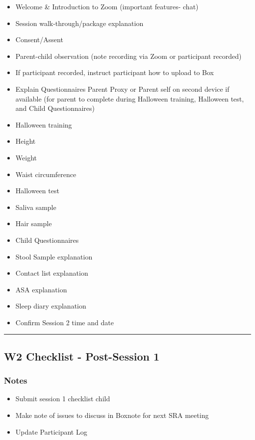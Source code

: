 \documentclass[]{book}
\providecommand{\tightlist}{%
  \setlength{\itemsep}{0pt}\setlength{\parskip}{0pt}}
\begin{document}
\begin{itemize}
\tightlist
\item
  Welcome \& Introduction to Zoom (important features- chat)
\item
  Session walk-through/package explanation
\item
  Consent/Assent
\item
  Parent-child observation (note recording via Zoom or participant recorded)
\item
  If participant recorded, instruct participant how to upload to Box
\item
  Explain Questionnaires Parent Proxy or Parent self on second device if available (for parent to complete during Halloween training, Halloween test, and Child Questionnaires)
\item
  Halloween training
\item
  Height
\item
  Weight
\item
  Waist circumference
\item
  Halloween test
\item
  Saliva sample
\item
  Hair sample
\item
  Child Questionnaires
\item
  Stool Sample explanation
\item
  Contact list explanation
\item
  ASA explanation
\item
  Sleep diary explanation
\item
  Confirm Session 2 time and date
\end{itemize}

\begin{center}\rule{0.5\linewidth}{0.5pt}\end{center}

\hypertarget{w2-checklist---post-session-1}{%
\subsection{W2 Checklist - Post-Session 1}\label{w2-checklist---post-session-1}}

\hypertarget{notes-2}{%
\subsubsection{Notes}\label{notes-2}}

\begin{itemize}
\tightlist
\item
  Submit session 1 checklist child
\item
  Make note of issues to discuss in Boxnote for next SRA meeting
\item
  Update Participant Log
\end{itemize}
\end{document}

